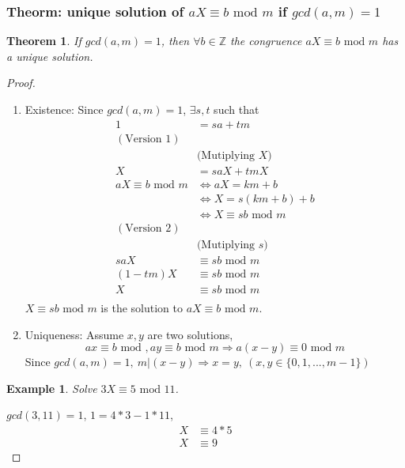 \documentclass[11pt,a4paper]{article}
\newtheorem{theorem}{Theorem}
\newtheorem{example}{Example}
\begin{document}
\subsubsection{Theorm: unique solution of $aX\equiv b \text{ mod }m$ if $gcd(a,m)=1$}
\begin{theorem}
If $gcd(a,m)=1$, then $\forall b\in \mathbb{Z}$ the congruence $aX\equiv b \text{ mod }m$ has a unique solution.
\end{theorem}
\begin{proof}
\quad

\begin{enumerate}[1)]
    \item Existence: Since $gcd(a,m)=1$, $\exists s,t$ such that
    \begin{equation}
        \begin{aligned}
        1&=sa+tm\\
        (\text{Version 1})&\\
        &\text{(Mutiplying $X$)}\\
        X&=saX+tmX\\
        aX\equiv b \text{ mod }m &\Leftrightarrow aX=km+b\\
        &\Leftrightarrow X=s(km+b)+b\\
        &\Leftrightarrow X\equiv sb \text{ mod }m\\
        (\text{Version 2})&\\
        &\text{(Mutiplying $s$)}\\
        saX&\equiv sb \text{ mod }m\\
        (1-tm)X&\equiv sb \text{ mod }m\\
        X&\equiv sb \text{ mod }m\\
        \end{aligned}
        \nonumber
    \end{equation}
    $X\equiv sb \text{ mod }m$ is the solution to $aX\equiv b \text{ mod }m$.
    \item Uniqueness: Assume $x,y$ are two solutions, $$ax\equiv b \text{ mod },ay\equiv b \text{ mod } m\Rightarrow	a(x-y)\equiv 0 \text{ mod }m$$
    Since $gcd(a,m)=1,\ m|(x-y)\Rightarrow x=y,\ (x,y\in\{0,1,...,m-1\})$
\end{enumerate}
\begin{example}
Solve $3X\equiv 5 \text{ mod }11$.
\end{example}
$gcd(3,11)=1$, $1=4*3-1*11$, 
\begin{equation}
    \begin{aligned}
        X&\equiv 4*5\\
        X&\equiv 9
    \end{aligned}
    \nonumber
\end{equation}

\end{proof}
\end{document}
